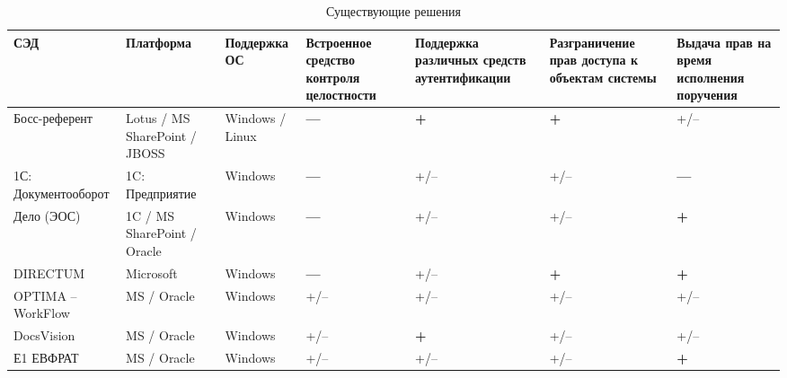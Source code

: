 \begin{table}[h!]
  \captionsetup{justification=raggedright}
  \caption{Существующие решения}\label{table:products}
 \begin{center}
  \begin{tabular}{| >{\centering}m{2.5cm} | >{\centering}m{2cm} | >{\centering}m{2cm} | >{\centering}m{2cm} | >{\centering}m{2cm} | >{\centering}m{2cm} | >{\centering}m{2cm} |}
  \hline
  \rowcolor{Gray} СЭД   & Платформа & Поддержка ОС & Встроенное средство контроля целостности & Поддержка различных средств аутентификации & Разграничение прав доступа к объектам системы & Выдача прав на время исполнения поручения \tabularnewline \hline
  Босс-референт & \color{Green} Lotus / MS SharePoint / JBOSS & \color{Green} Windows / Linux & \color{Red} \textbf{---} &  \color{Green} \textbf{+} & \color{Green} \textbf{+} & +/-- \tabularnewline \hline

  1С: Документооборот & \color{Red} 1C: Предприятие & \color{Red} Windows & \color{Red} \textbf{---} & +/-- & +/-- & \color{Red} \textbf{---} \tabularnewline \hline




  Дело (ЭОС) & \color{Green} 1C / MS SharePoint / Oracle & \color{Red} Windows & \color{Red} \textbf{---} & +/--  & +/-- & \color{Green} \textbf{+} \tabularnewline \hline

  DIRECTUM & \color{Red} Microsoft & \color{Red} Windows  & \color{Red} \textbf{---} & +/-- & \color{Green} \textbf{+} & \color{Green} \textbf{+} \tabularnewline \hline

  OPTIMA -- WorkFlow & \color{Green} MS / Oracle & \color{Red} Windows & +/-- & +/-- & +/-- & +/-- \tabularnewline \hline

  DocsVision & \color{Green} MS / Oracle & \color{Red} Windows  & +/-- & \color{Green} \textbf{+} & +/-- & +/-- \tabularnewline \hline

  Е1 ЕВФРАТ & \color{Green} MS / Oracle & \color{Red} Windows & +/-- & +/-- & +/-- & \color{Green} \textbf{+} \tabularnewline \hline
  \end{tabular}
 \end{center}
\end{table}

